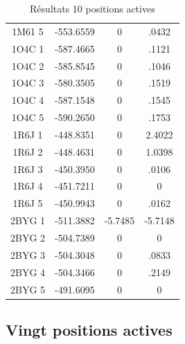 \documentclass[a4paper,12pt]{article}
\begin{document}
\begin{table}[!htbp]
\begin{tabular}{|c|c|c|c|}
        1M61 5 & -553.6559 & 0 & .0432 \\
        1O4C 1 & -587.4665 & 0 & .1121 \\
        1O4C 2 & -585.8545 & 0 & .1046 \\
        1O4C 3 & -580.3505 & 0 & .1519 \\
        1O4C 4 & -587.1548 & 0 & .1545 \\
        1O4C 5 & -590.2650 & 0 & .1753 \\
        1R6J 1 & -448.8351 & 0 & 2.4022 \\
        1R6J 2 & -448.4631 & 0 & 1.0398 \\
        1R6J 3 & -450.3950 & 0 & .0106 \\
        1R6J 4 & -451.7211 & 0 & 0 \\
        1R6J 5 & -450.9943 & 0 & .0162 \\
        2BYG 1 & -511.3882 & -5.7485 & -5.7148 \\
        2BYG 2 & -504.7389 & 0 & 0 \\
        2BYG 3 & -504.3048 & 0 & .0833 \\
        2BYG 4 & -504.3466 & 0 & .2149 \\
        2BYG 5 & -491.6095 & 0 & 0 \\

        \hline


 \end{tabular}      
 \caption{Résultats 10 positions actives }
 \label{tab_echec2BYG__1}      
\end{table}


   \subsection{ Vingt positions actives}
\end{document}
